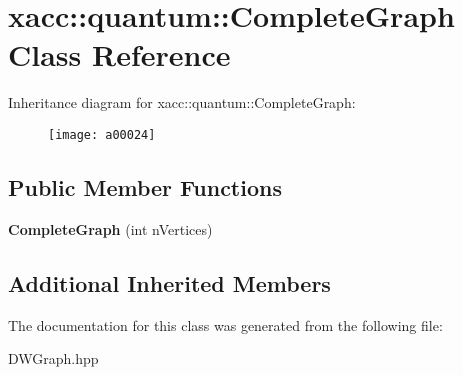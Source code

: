 \hypertarget{a00024}{}\section{xacc\+:\+:quantum\+:\+:Complete\+Graph Class Reference}
\label{a00024}
Inheritance diagram for xacc\+:\+:quantum\+:\+:Complete\+Graph\+:\begin{figure}[H]
\begin{center}
\leavevmode
\texttt{[image: a00024]}
\end{center}
\end{figure}
\subsection*{Public Member Functions}
\begin{DoxyCompactItemize}
\item 
{\bfseries Complete\+Graph} (int n\+Vertices)\hypertarget{a00024_a70eeb65709e217e61bb0066365579c39}{}\label{a00024_a70eeb65709e217e61bb0066365579c39}

\end{DoxyCompactItemize}
\subsection*{Additional Inherited Members}


The documentation for this class was generated from the following file\+:\begin{DoxyCompactItemize}
\item 
D\+W\+Graph.\+hpp\end{DoxyCompactItemize}
